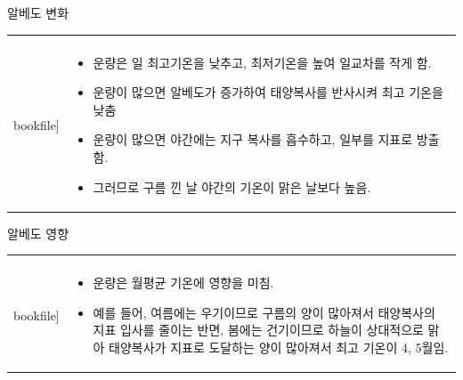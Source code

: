 \begin{frame}[t]{알베도 변화}
	\begin{tabular}{ll}
		\begin{minipage}[t]{0.450\textwidth}
			\begin{figure}[t]
				\texttt{[image: \\bookfile]}
			\end{figure}
		\end{minipage}	
		&
		\begin{minipage}[t]{0.5\textwidth}
			\begin{itemize} \scriptsize 
				\item 운량은 일 최고기온을 낮추고, 최저기온을 높여 일교차를 작게 함.
				\item 운량이 많으면 알베도가 증가하여 태양복사를 
				반사시켜 최고 기온을 낮춤
				\item 운량이 많으면 야간에는 지구 복사를 흡수하고, 
				일부를 지표로 방출함. 
				\item 그러므로 구름 낀 날 야간의 기온이 맑은 날보다 높음.
				
			\end{itemize}			
		\end{minipage}
	\end{tabular}
	
\end{frame}



\begin{frame}[t]{알베도 영향}
	\begin{tabular}{ll}
		\begin{minipage}[t]{0.450\textwidth}
			\begin{figure}[t]
				\texttt{[image: \\bookfile]}
			\end{figure}
		\end{minipage}	
		&
		\begin{minipage}[t]{0.5\textwidth}
			\begin{itemize} \scriptsize 
				\item 운량은 월평균 기온에 영향을 미침. 
				\item 예를 들어, 여름에는 우기이므로 구름의 양이 많아져서 태양복사의 지표 입사를 줄이는 반면, 봄에는 건기이므로 하늘이 상대적으로 맑아 태양복사가 지표로 도달하는 양이 많아져서 최고 기온이 4, 5월임.
			\end{itemize}			
		\end{minipage}
	\end{tabular}
	
\end{frame}



